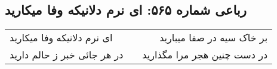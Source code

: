 \begin{center}
\section*{رباعی شماره ۵۶۵: ای نرم دلانیکه وفا میکارید}
\label{sec:0565}
\begin{longtable}{l p{0.5cm} r}
ای نرم دلانیکه وفا میکارید
&&
بر خاک سیه در صفا میبارید
\\
در هر جائی خبر ز حالم دارید
&&
در دست چنین هجر مرا مگذارید
\\
\end{longtable}
\end{center}
